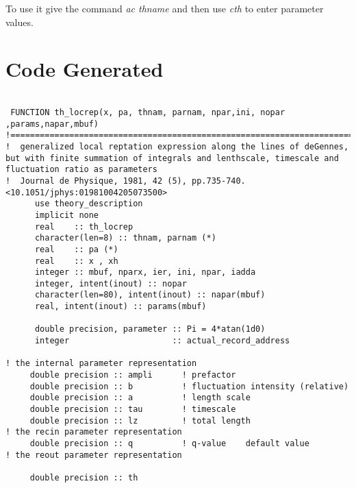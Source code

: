 \documentclass{article}
\begin{document}
To use it give the command \emph{ac thname} and then use \emph{cth} to enter parameter values.

\section{Code Generated}
\label{sec:codegen}


\tiny
\begin{verbatim}

 FUNCTION th_locrep(x, pa, thnam, parnam, npar,ini, nopar ,params,napar,mbuf)
!================================================================================
!  generalized local reptation expression along the lines of deGennes, but with finite summation of integrals and lenthscale, timescale and fluctuation ratio as parameters
!  Journal de Physique, 1981, 42 (5), pp.735-740. <10.1051/jphys:01981004205073500>
      use theory_description 
      implicit none 
      real    :: th_locrep
      character(len=8) :: thnam, parnam (*) 
      real    :: pa (*) 
      real    :: x , xh
      integer :: mbuf, nparx, ier, ini, npar, iadda
      integer, intent(inout) :: nopar       
      character(len=80), intent(inout) :: napar(mbuf) 
      real, intent(inout) :: params(mbuf) 
     
      double precision, parameter :: Pi = 4*atan(1d0)
      integer                     :: actual_record_address
     
! the internal parameter representation 
     double precision :: ampli      ! prefactor                                                                       
     double precision :: b          ! fluctuation intensity (relative)                                                
     double precision :: a          ! length scale                                                                    
     double precision :: tau        ! timescale                                                                       
     double precision :: lz         ! total length                                                                    
! the recin parameter representation 
     double precision :: q          ! q-value    default value                                                        
! the reout parameter representation 
 
     double precision :: th
 

\end{verbatim}
\end{document}
